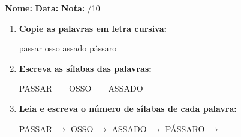 \begin{exercicio}



\noindent\textbf{Nome:} \underline{\hspace{3.2cm}} \quad \textbf{Data:} \underline{\hspace{1.6cm}} \quad \textbf{Nota:} \underline{\hspace{0.9cm}}/10


\begin{enumerate}

  \item \textbf{Copie as palavras em letra cursiva:}
  \begin{center}
  passar \quad osso \quad assado \quad pássaro
  \end{center}
  \begin{center}
  \underline{\hspace{2.4cm}} \quad \underline{\hspace{2.4cm}} \quad \underline{\hspace{2.4cm}} \quad \underline{\hspace{2.4cm}}
  \end{center}

  \item \textbf{Escreva as sílabas das palavras:}
  \begin{center}
  PASSAR $=$ \underline{\hspace{1.5cm}} \underline{\hspace{1.5cm}} \quad OSSO $=$ \underline{\hspace{1.5cm}} \underline{\hspace{1.5cm}} \quad ASSADO $=$ \underline{\hspace{1.5cm}} \underline{\hspace{1.5cm}}
  \end{center}

  \item \textbf{Leia e escreva o número de sílabas de cada palavra:}
  \begin{center}
  PASSAR $\rightarrow$ \underline{\hspace{0.9cm}} \quad OSSO $\rightarrow$ \underline{\hspace{0.9cm}} \quad ASSADO $\rightarrow$ \underline{\hspace{0.9cm}} \quad PÁSSARO $\rightarrow$ \underline{\hspace{0.9cm}}
  \end{center}


\end{enumerate}
\end{exercicio}

